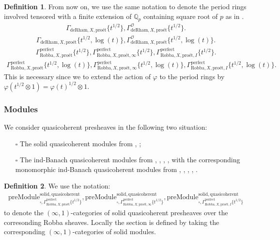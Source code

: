 \documentclass[12pt]{book}
\theoremstyle{definition}
\newtheorem{definition}{Definition}
\begin{document}
\begin{definition}
From now on, we use the same notation to denote the period rings involved tensored with a finite extension of $\mathbb{Q}_p$ containing square root of $p$ as in \cite{BS}.
\begin{align}
\Gamma_{\text{deRham},X,\text{pro\'et}}\{t^{1/2}\},\Gamma^\mathcal{O}_{\text{deRham},X,\text{pro\'et}}\{t^{1/2}\}.
\end{align}
\begin{align}
\Gamma_{\text{deRham},X,\text{pro\'et}}\{t^{1/2},\log(t)\},\Gamma^\mathcal{O}_{\text{deRham},X,\text{pro\'et}}\{t^{1/2},\log(t)\}.
\end{align}
\begin{align}
\Gamma^\mathrm{perfect}_{\text{Robba},X,\text{pro\'et}}\{t^{1/2}\},\Gamma^\mathrm{perfect}_{\text{Robba},X,\text{pro\'et},\infty}\{t^{1/2}\},\Gamma^\mathrm{perfect}_{\text{Robba},X,\text{pro\'et},I}\{t^{1/2}\}.
\end{align}
\begin{align}
\Gamma^\mathrm{perfect}_{\text{Robba},X,\text{pro\'et}}\{t^{1/2},\log(t)\},\Gamma^\mathrm{perfect}_{\text{Robba},X,\text{pro\'et},\infty}\{t^{1/2},\log(t)\},\Gamma^\mathrm{perfect}_{\text{Robba},X,\text{pro\'et},I}\{t^{1/2},\log(t)\}.
\end{align}
This is necessary since we to extend the action of $\varphi$ to the period rings by $\varphi(t^{1/2}\otimes 1)=\varphi(t)^{1/2}\otimes 1$.
\end{definition}

\subsubsection{Modules}


\noindent We consider quasicoherent presheaves in the following two situation:
\begin{itemize}
\item[$\square$] The solid quasicoherent modules from \cite{CS1}, \cite{CS2};
\item[$\square$] The ind-Banach quasicoherent modules from \cite{BK}, \cite{BBK}, \cite{BBBK}, \cite{KKM}, \cite{KM} with the corresponding monomorphic ind-Banach quasicoherent modules from \cite{BK}, \cite{BBK}, \cite{BBBK}, \cite{KKM}, \cite{KM}.
\end{itemize}

\begin{definition}
We use the notation:
\begin{align}
\mathrm{preModule}^\mathrm{solid,quasicoherent}_{\square,\Gamma^\mathrm{perfect}_{\text{Robba},X,\text{pro\'et}}\{t^{1/2}\}},\mathrm{preModule}^\mathrm{solid,quasicoherent}_{\square,\Gamma^\mathrm{perfect}_{\text{Robba},X,\text{pro\'et},\infty}\{t^{1/2}\}},
\mathrm{preModule}^\mathrm{solid,quasicoherent}_{\square,\Gamma^\mathrm{perfect}_{\text{Robba},X,\text{pro\'et},I}\{t^{1/2}\}} 
\end{align}
to denote the $(\infty,1)$-categories of solid quasicoherent presheaves over the corresonding Robba sheaves. Locally the section is defined by taking the corresponding $(\infty,1)$-categories of solid modules.
\end{definition}
\end{document}
